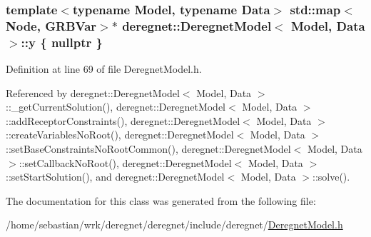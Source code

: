 \subsubsection[{\texorpdfstring{y}{y}}]{\setlength{\rightskip}{0pt plus 5cm}template$<$typename Model, typename Data$>$ std\+::map$<${\bf Node}, G\+R\+B\+Var$>$$\ast$ {\bf deregnet\+::\+Deregnet\+Model}$<$ Model, {\bf Data} $>$\+::y \{ nullptr \}\hspace{0.3cm}{\ttfamily [protected]}}\hypertarget{classderegnet_1_1DeregnetModel_ae76df61afe302b939165facf3dd21ac8}{}\label{classderegnet_1_1DeregnetModel_ae76df61afe302b939165facf3dd21ac8}


Definition at line 69 of file Deregnet\+Model.\+h.



Referenced by deregnet\+::\+Deregnet\+Model$<$ Model, Data $>$\+::\+\_\+get\+Current\+Solution(), deregnet\+::\+Deregnet\+Model$<$ Model, Data $>$\+::add\+Receptor\+Constraints(), deregnet\+::\+Deregnet\+Model$<$ Model, Data $>$\+::create\+Variables\+No\+Root(), deregnet\+::\+Deregnet\+Model$<$ Model, Data $>$\+::set\+Base\+Constraints\+No\+Root\+Common(), deregnet\+::\+Deregnet\+Model$<$ Model, Data $>$\+::set\+Callback\+No\+Root(), deregnet\+::\+Deregnet\+Model$<$ Model, Data $>$\+::set\+Start\+Solution(), and deregnet\+::\+Deregnet\+Model$<$ Model, Data $>$\+::solve().



The documentation for this class was generated from the following file\+:\begin{DoxyCompactItemize}
\item 
/home/sebastian/wrk/deregnet/deregnet/include/deregnet/\hyperlink{DeregnetModel_8h}{Deregnet\+Model.\+h}\end{DoxyCompactItemize}
